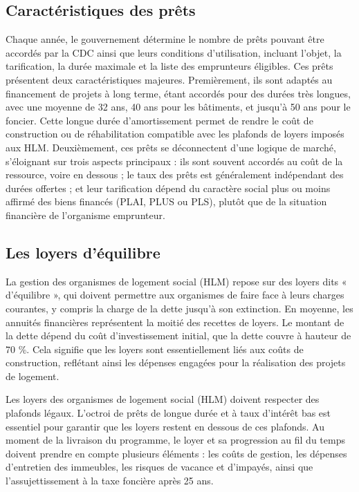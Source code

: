 \documentclass[a4paper, 12pt]{report}
\begin{document}
\subsection{Caractéristiques des prêts}

Chaque année, le gouvernement détermine le nombre de prêts pouvant être accordés par la CDC ainsi que leurs conditions d'utilisation, incluant l'objet, la tarification, la durée maximale et la liste des emprunteurs éligibles. Ces prêts présentent deux caractéristiques majeures. Premièrement, ils sont adaptés au financement de projets à long terme, étant accordés pour des durées très longues, avec une moyenne de 32 ans, 40 ans pour les bâtiments, et jusqu'à 50 ans pour le foncier. Cette longue durée d'amortissement permet de rendre le coût de construction ou de réhabilitation compatible avec les plafonds de loyers imposés aux HLM. Deuxièmement, ces prêts se déconnectent d'une logique de marché, s'éloignant sur trois aspects principaux : ils sont souvent accordés au coût de la ressource, voire en dessous ; le taux des prêts est généralement indépendant des durées offertes ; et leur tarification dépend du caractère social plus ou moins affirmé des biens financés (PLAI, PLUS ou PLS), plutôt que de la situation financière de l'organisme emprunteur.

\subsection{Les loyers d'équilibre}

La gestion des organismes de logement social (HLM) repose sur des loyers dits « d’équilibre », qui doivent permettre aux organismes de faire face à leurs charges courantes, y compris la charge de la dette jusqu'à son extinction. En moyenne, les annuités financières représentent la moitié des recettes de loyers. Le montant de la dette dépend du coût d'investissement initial, que la dette couvre à hauteur de 70 \%. Cela signifie que les loyers sont essentiellement liés aux coûts de construction, reflétant ainsi les dépenses engagées pour la réalisation des projets de logement.

Les loyers des organismes de logement social (HLM) doivent respecter des plafonds légaux. L'octroi de prêts de longue durée et à taux d'intérêt bas est essentiel pour garantir que les loyers restent en dessous de ces plafonds. Au moment de la livraison du programme, le loyer et sa progression au fil du temps doivent prendre en compte plusieurs éléments : les coûts de gestion, les dépenses d'entretien des immeubles, les risques de vacance et d'impayés, ainsi que l'assujettissement à la taxe foncière après 25 ans.
\end{document}
